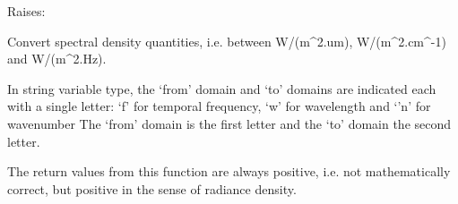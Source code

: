\documentclass[a4paper,10pt,english]{sphinxmanual}
\begin{document}
\begin{fulllineitems}
\begin{description}
\item[{Raises:}] \leavevmode
{}

\end{description}

\end{fulllineitems}


\begin{fulllineitems}
\label{ryutils:pyradi.ryutils.convertSpectralDensity}
Convert spectral density quantities, i.e. between W/(m\textasciicircum{}2.um), W/(m\textasciicircum{}2.cm\textasciicircum{}-1) and W/(m\textasciicircum{}2.Hz).

In string variable type, the `from' domain and `to' domains are indicated each with a 
single letter:
`f' for temporal frequency, `w' for wavelength and `'n' for wavenumber
The `from' domain is the first letter and the `to' domain the second letter.

The return values from this function are always positive, i.e. not mathematically correct,
but positive in the sense of radiance density.


\end{fulllineitems}
\end{document}
